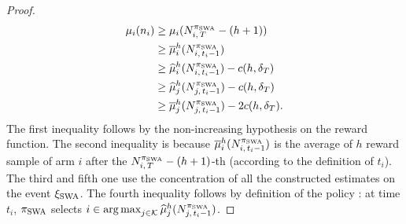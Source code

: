 \begin{proof}
\begin{align}
\label{eq:overpull-SWA1}
\mu_i(n_i) &\geq \mu_i(N_{i,\,T}^{\pi_{\rm SWA}} - (h+1) )\nonumber\\
 &\geq \overline{\mu}_i^h(N_{i,\,t_i -1}^{\pi_{\rm SWA}}) \nonumber\\
 &\geq \widehat{\mu}_i^h(N_{i,\,t_i -1}^{\pi_{\rm SWA}}) - c(h, \delta_T) \nonumber\\
& \geq \widehat{\mu}_j^h(N_{j,\,t_i -1}^{\pi_{\rm SWA}}) - c(h, \delta_T)  \nonumber\\
& \geq \overline{\mu}_j^h(N_{j,\,t_i -1}^{\pi_{\rm SWA}}) - 2c(h, \delta_T). 
\end{align}
%
The first inequality follows by the non-increasing hypothesis on the reward function. The second inequality is because $\overline{\mu}_i^h(N_{i,\,t_i -1}^{\pi_{\rm SWA}})$ is the average of $h$ reward sample of arm $i$ after the $N_{i,\,T}^{\pi_{\rm SWA}} - (h+1)$-th (according to the definition of $t_i$). The third and fifth one use the concentration of all the constructed estimates on the event $\xi_{\rm SWA}$.  The fourth  inequality follows by definition of the policy : at time $t_i$, $\pi_{\rm SWA}$ selects $i \in \operatorname*{arg\,max}_{j \in \mathcal{K}} \widehat{\mu}_j^h(N_{j,\,t_i -1}^{\pi_{\rm SWA}})$.


\end{proof}
